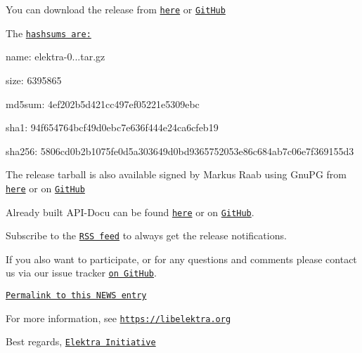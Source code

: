 You can download the release from \href{https://www.libelektra.org/ftp/elektra/releases/elektra-0.8.26.tar.gz}{\tt here} or \href{https://github.com/ElektraInitiative/ftp/blob/master/releases/elektra-0.8.26.tar.gz?raw=true}{\tt Git\+Hub}

The \href{https://github.com/ElektraInitiative/ftp/blob/master/releases/elektra-0.8.26.tar.gz.hashsum?raw=true}{\tt hashsums are\+:}


\begin{DoxyItemize}
\item name\+: elektra-\/0...\+tar.\+gz
\item size\+: 6395865
\item md5sum\+: 4ef202b5d421cc497ef05221e5309ebc
\item sha1\+: 94f654764bcf49d0ebc7e636f444e24ca6cfeb19
\item sha256\+: 5806cd0b2b1075fe0d5a303649d0bd9365752053e86c684ab7c06e7f369155d3
\end{DoxyItemize}

The release tarball is also available signed by Markus Raab using Gnu\+PG from \href{https://www.libelektra.org/ftp/elektra/releases/elektra-0.8.26.tar.gz.gpg}{\tt here} or on \href{https://github.com/ElektraInitiative/ftp/blob/master/releases//elektra-0.8.26.tar.gz.gpg?raw=true}{\tt Git\+Hub}

Already built A\+P\+I-\/\+Docu can be found \href{https://doc.libelektra.org/api/0.8.26/html/}{\tt here} or on \href{https://github.com/ElektraInitiative/doc/tree/master/api/0.8.26}{\tt Git\+Hub}.

Subscribe to the \href{https://www.libelektra.org/news/feed.rss}{\tt R\+SS feed} to always get the release notifications.

If you also want to participate, or for any questions and comments please contact us via our issue tracker \href{http://issues.libelektra.org}{\tt on Git\+Hub}.

\href{https://www.libelektra.org/news/0.8.26-release}{\tt Permalink to this N\+E\+WS entry}

For more information, see \href{https://libelektra.org}{\tt https\+://libelektra.\+org}

Best regards, \href{https://www.libelektra.org/developers/authors}{\tt Elektra Initiative} 